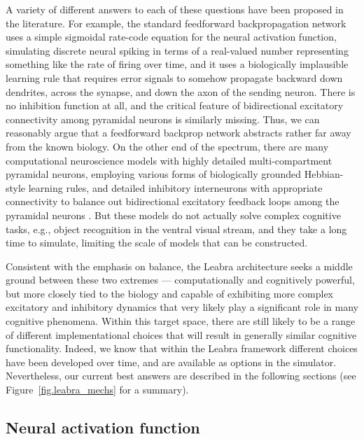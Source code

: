 \documentclass[11pt,twoside]{article}
\begin{document}
A variety of different answers to each of these questions have been
proposed in the literature.  For example, the standard feedforward
backpropagation network uses a simple sigmoidal rate-code equation for
the neural activation function, simulating discrete neural spiking in
terms of a real-valued number representing something like the rate of
firing over time, and it uses a biologically implausible learning rule
that requires error signals to somehow propagate backward down
dendrites, across the synapse, and down the axon of the sending
neuron.  There is no inhibition function at all, and the critical
feature of bidirectional excitatory connectivity among pyramidal
neurons is similarly missing.  Thus, we can reasonably argue that a
feedforward backprop network abstracts rather far away from the known
biology.  On the other end of the spectrum, there are many
computational neuroscience models with highly detailed
multi-compartment pyramidal neurons, employing various forms of
biologically grounded Hebbian-style learning rules, and detailed
inhibitory interneurons with appropriate connectivity to balance out
bidirectional excitatory feedback loops among the pyramidal neurons
\cite{biodetrefs}.  But these models do not actually solve complex
cognitive tasks, e.g., object recognition in the ventral visual
 stream, and they take a long time to simulate, limiting the scale of
 models that can be constructed.

Consistent with the emphasis on balance, the Leabra architecture seeks
a middle ground between these two extremes --- computationally and
cognitively powerful, but more closely tied to the biology and capable
of exhibiting more complex excitatory and inhibitory dynamics that
very likely play a significant role in many cognitive phenomena.
Within this target space, there are still likely to be a range of
different implementational choices that will result in generally
similar cognitive functionality.  Indeed, we know that within the
Leabra framework different choices have been developed over time, and
are available as options in the simulator.  Nevertheless, our current
best answers are described in the following sections (see
 Figure~\ref{fig.leabra_mechs} for a summary).

\subsection{Neural activation function}
\end{document}

